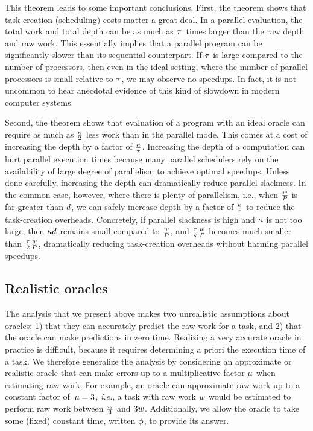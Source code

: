 This theorem leads to some important conclusions.  First, the theorem
shows that task creation (scheduling) costs matter a great deal.  In a
parallel evaluation, the total work and total depth can be as much as
${\tau}$~times larger than the raw depth and raw work.  This essentially
implies that a parallel program can be significantly slower than its
sequential counterpart.  If ${\tau}$ is large compared to the number of
processors, then even in the ideal setting, where the number of
parallel processors is small relative to ${\tau}$, we may observe no
speedups.  In fact, it is not uncommon to hear anecdotal evidence of
this kind of slowdown in modern computer systems.


Second, the theorem shows that evaluation of a program with an ideal
oracle can require as much as $\frac{{\kappa}}{2}$ less work than in the
parallel mode.  This comes at a cost of increasing the depth by a
factor of $\frac{{\kappa}}{{\tau}}$.  Increasing the depth of a computation can
hurt parallel execution times because many parallel schedulers rely on
the availability of large degree of parallelism to achieve optimal
speedups.  Unless done carefully, increasing the depth can dramatically
reduce parallel slackness.  In the common case, however, where there
is plenty of parallelism, i.e., when $\frac{w}{P}$ is far greater
than $d$, we can safely increase depth by a factor of
$\frac{{\kappa}}{{\tau}}$ to reduce the task-creation overheads.
Concretely, if parallel slackness is high and ${\kappa}$ is not too
large, then ${\kappa}d$ remains small compared to $\frac{w}{P}$, and
$\frac{{\tau}}{{\kappa}}\frac{w}{P}$ becomes much smaller than
$\frac{{\tau}}{2}\frac{w}{P}$,  dramatically reducing task-creation overheads
without harming parallel speedups.

\subsection{Realistic oracles}
\label{sec:realistic-oracles}
\label{sec:estimate}

The analysis that we present above makes two unrealistic assumptions
about oracles: 1) that they can accurately predict the raw work for a
task, and 2) that the oracle can make predictions in zero time.
Realizing a very accurate oracle in practice is difficult, because it
requires determining a priori the execution time of a task.  We
therefore generalize the analysis by considering an approximate or
realistic oracle that can make errors up to a multiplicative factor
${\mu}$ when estimating raw work.  For example, an oracle can
approximate raw work up to a constant factor of~${\mu}=3$,
\textit{i.e.}, a task with raw work $w$ would be estimated to
perform raw work between $\frac{w}{3}$ and $3w$.  Additionally, we
allow the oracle to take some (fixed) constant time, written ${\phi}$,
to provide its answer.

